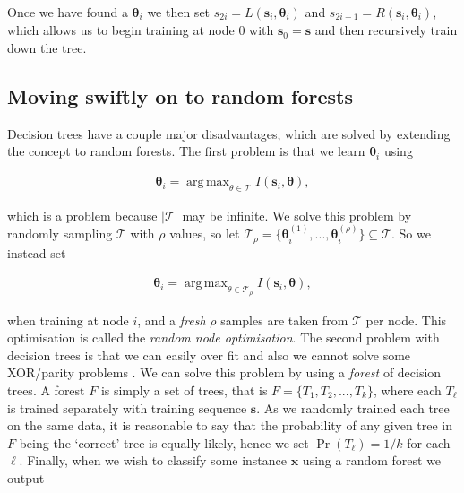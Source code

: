 \documentclass[12pt,twoside,notitlepage]{report}
\newcommand{\vc}[1]{\mathbf{#1}}
\newcommand{\cl}[1]{\mathcal{#1}}
\DeclareMathOperator*{\argmax}{arg\,max}
\begin{document}
            Once we have found a $\vc{\theta}_i$ we then set $s_{2i} = L(\vc{s}_i, \vc{\theta}_i)$ and 
            $s_{2i+1} = R(\vc{s}_i, \vc{\theta}_i)$, which allows us to begin training at node $0$ with $\vc{s}_0 = \vc{s}$ 
            and then recursively train down the tree. \cite{criminisi2013decision}


        \subsection{Moving swiftly on to random forests}
            Decision trees have a couple major disadvantages, which are solved by extending the concept to random 
            forests. The first problem is that we learn $\vc{\theta}_i$ using

            \begin{align} 
                \vc{\theta}_i = \argmax_{\theta\in\cl{T}} I(\vc{s}_i, \vc{\theta}),
            \end{align}

            which is a problem because $|\cl{T}|$ may be infinite. We solve this problem by randomly sampling $\cl{T}$ with 
            $\rho$ values, so let $\cl{T}_\rho = \{ \vc{\theta}_i^{(1)}, ..., \vc{\theta}_i^{(\rho)} \} \subseteq \cl{T}$.
            So we instead set 

            \begin{align} 
                \vc{\theta}_i = \argmax_{\theta\in\cl{T}_\rho} I(\vc{s}_i, \vc{\theta}),
            \end{align}            

            when training at node $i$, and a \textit{fresh} $\rho$ samples are taken from $\cl{T}$ per node. This 
            optimisation is called the \textit{random node optimisation}. The second problem with decision trees is that 
            we can easily over fit and also we cannot solve some XOR/parity problems \cite{criminisi2013decision}. We 
            can solve this problem by using a \textit{forest} of decision trees. A forest $F$ is simply a set of trees, 
            that is $F = \{ T_1, T_2, ..., T_k \}$, where each $T_\ell$ is trained separately with training sequence 
            $\vc{s}$. As we randomly trained each tree on the same data, it is reasonable to say that the probability of 
            any given tree in $F$ being the `correct' tree is equally likely, hence we set $\Pr(T_\ell) = 1/k$ for each 
            $\ell$. Finally, when we wish to classify some instance $\vc{x}$ using a random forest we output 
\end{document}
